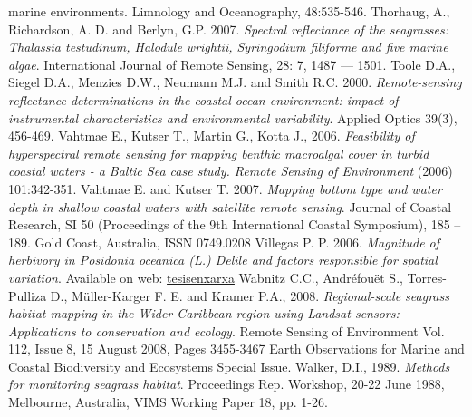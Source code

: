 \documentclass[11pt]{article}
\begin{document}
\begin{thebibliography}{999}
{marine environments}. Limnology and Oceanography, 48:535-546. \pageref{Stephens03}
Thorhaug, A., Richardson, A. D. and Berlyn, G.P. 2007. \emph{Spectral reflectance of the seagrasses: Thalassia testudinum, Halodule wrightii, Syringodium filiforme and five marine
algae}. International Journal of Remote Sensing, 28: 7, 1487 — 1501. \pageref{Thorhaug07}
Toole D.A., Siegel D.A., Menzies D.W., Neumann M.J. and Smith R.C. 2000. \emph{Remote-sensing reflectance determinations in the coastal ocean environment: impact of instrumental characteristics and environmental variability}. Applied Optics 39(3), 456-469. \pageref{Toole00}
Vahtmae E., Kutser T., Martin G., Kotta J., 2006. \emph{Feasibility of hyperspectral remote sensing for mapping benthic macroalgal cover in turbid coastal waters - a Baltic Sea case
study. Remote Sensing of Environment} (2006) 101:342-351. \pageref{Vahtmae06}
Vahtmae E. and Kutser T. 2007. \emph{Mapping bottom type and water depth in shallow
coastal waters with satellite remote sensing}. Journal of Coastal Research, SI 50 (Proceedings of the 9th International Coastal Symposium), 185 – 189. Gold Coast, Australia, ISSN 0749.0208 \pageref{Vahtmae07}
Villegas P. P. 2006. \emph{Magnitude of herbivory in \textit{Posidonia oceanica} (L.) Delile and
factors responsible for spatial variation}. Available on web: \href{http://www.tesisenxarxa.net/}{tesisenxarxa} \pageref{Villegas06}
Wabnitz C.C., Andr\'efou\"et S., Torres-Pulliza D., M\"uller-Karger F. E. and Kramer P.A., 2008. \emph{Regional-scale seagrass habitat mapping in the Wider Caribbean region using Landsat sensors: Applications to conservation and ecology}. Remote Sensing of Environment Vol. 112, Issue 8, 15 August 2008, Pages 3455-3467 Earth Observations for Marine and Coastal Biodiversity and Ecosystems Special Issue. \pageref{Wabnitz08}
Walker, D.I., 1989. \emph{Methods for monitoring seagrass habitat}. Proceedings Rep. Workshop, 20-22 June 1988, Melbourne, Australia, VIMS Working Paper 18, pp. 1-26. \pageref{Walker89}

\end{thebibliography}
\end{document}
